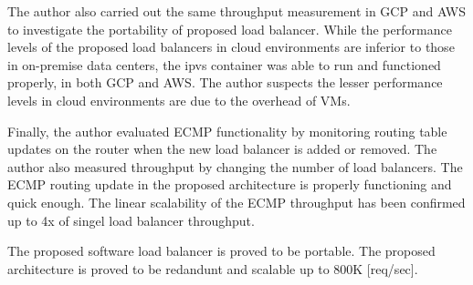 The author also carried out the same throughput measurement in GCP and AWS to investigate the portability of proposed load balancer.
While the performance levels of the proposed load balancers in cloud environments are inferior to those in on-premise data centers, the ipvs container was able to run and functioned properly, in both GCP and AWS.
The author suspects the lesser performance levels in cloud environments are due to the overhead of VMs.

Finally, the author evaluated ECMP functionality by monitoring routing table updates on the router when the new load balancer is added or removed.
The author also measured throughput by changing the number of load balancers.
The ECMP routing update in the proposed architecture is properly functioning and quick enough.
The linear scalability of the ECMP throughput has been confirmed up to 4x of singel load balancer throughput.

The proposed software load balancer is proved to be portable.
The proposed architecture is proved to be redandunt and scalable up to 800K [req/sec].
